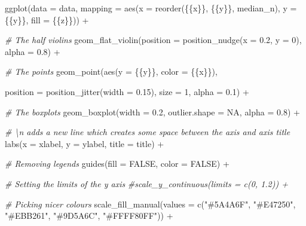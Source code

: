 \documentclass[a4paper,nobind]{templates/ociamthesis}
\newenvironment{Shaded}{\begin{snugshade}}{\end{snugshade}}
\newcommand{\AttributeTok}[1]{\textcolor[rgb]{0.77,0.63,0.00}{#1}}
\newcommand{\CommentTok}[1]{\textcolor[rgb]{0.56,0.35,0.01}{\textit{#1}}}
\newcommand{\ConstantTok}[1]{\textcolor[rgb]{0.00,0.00,0.00}{#1}}
\newcommand{\DecValTok}[1]{\textcolor[rgb]{0.00,0.00,0.81}{#1}}
\newcommand{\FloatTok}[1]{\textcolor[rgb]{0.00,0.00,0.81}{#1}}
\newcommand{\FunctionTok}[1]{\textcolor[rgb]{0.00,0.00,0.00}{#1}}
\newcommand{\NormalTok}[1]{#1}
\newcommand{\SpecialCharTok}[1]{\textcolor[rgb]{0.00,0.00,0.00}{#1}}
\newcommand{\StringTok}[1]{\textcolor[rgb]{0.31,0.60,0.02}{#1}}
\renewenvironment{Shaded}
{
  \vspace{10pt}%
  \begin{snugshade}%
}{%
  \end{snugshade}%
  \vspace{8pt}%
}
\begin{document}
\begin{landscape}
\begin{Shaded}
\begin{Highlighting}[]
  \FunctionTok{ggplot}\NormalTok{(}\AttributeTok{data =}\NormalTok{ data, }
           \AttributeTok{mapping =} \FunctionTok{aes}\NormalTok{(}\AttributeTok{x =} \FunctionTok{reorder}\NormalTok{(\{\{x\}\}, \{\{y\}\}, median\_n), }\AttributeTok{y =}\NormalTok{ \{\{y\}\}, }\AttributeTok{fill =}\NormalTok{ \{\{z\}\})) }\SpecialCharTok{+}
    
    \CommentTok{\# The half violins}
    \FunctionTok{geom\_flat\_violin}\NormalTok{(}\AttributeTok{position =} \FunctionTok{position\_nudge}\NormalTok{(}\AttributeTok{x =} \FloatTok{0.2}\NormalTok{, }\AttributeTok{y =} \DecValTok{0}\NormalTok{), }\AttributeTok{alpha =} \FloatTok{0.8}\NormalTok{) }\SpecialCharTok{+}
    
    \CommentTok{\# The points}
    \FunctionTok{geom\_point}\NormalTok{(}\FunctionTok{aes}\NormalTok{(}\AttributeTok{y =}\NormalTok{ \{\{y\}\}, }\AttributeTok{color =}\NormalTok{ \{\{x\}\}), }
    
    \AttributeTok{position =} \FunctionTok{position\_jitter}\NormalTok{(}\AttributeTok{width =} \FloatTok{0.15}\NormalTok{), }\AttributeTok{size =} \DecValTok{1}\NormalTok{, }\AttributeTok{alpha =} \FloatTok{0.1}\NormalTok{) }\SpecialCharTok{+}
    
    \CommentTok{\# The boxplots}
    \FunctionTok{geom\_boxplot}\NormalTok{(}\AttributeTok{width =} \FloatTok{0.2}\NormalTok{, }\AttributeTok{outlier.shape =} \ConstantTok{NA}\NormalTok{, }\AttributeTok{alpha =} \FloatTok{0.8}\NormalTok{) }\SpecialCharTok{+}
    
    \CommentTok{\# \textbackslash{}n adds a new line which creates some space between the axis and axis title}
    \FunctionTok{labs}\NormalTok{(}\AttributeTok{x =}\NormalTok{ xlabel, }\AttributeTok{y =}\NormalTok{ ylabel, }\AttributeTok{title =}\NormalTok{ title) }\SpecialCharTok{+}
    
    \CommentTok{\# Removing legends}
    \FunctionTok{guides}\NormalTok{(}\AttributeTok{fill =} \ConstantTok{FALSE}\NormalTok{, }\AttributeTok{color =} \ConstantTok{FALSE}\NormalTok{) }\SpecialCharTok{+}
    
    \CommentTok{\# Setting the limits of the y axis}
    \CommentTok{\#scale\_y\_continuous(limits = c(0, 1.2)) +}
    
    \CommentTok{\# Picking nicer colours}
    \FunctionTok{scale\_fill\_manual}\NormalTok{(}\AttributeTok{values =} \FunctionTok{c}\NormalTok{(}\StringTok{"\#5A4A6F"}\NormalTok{, }\StringTok{"\#E47250"}\NormalTok{,  }\StringTok{"\#EBB261"}\NormalTok{, }\StringTok{"\#9D5A6C"}\NormalTok{, }\StringTok{"\#FFFF80FF"}\NormalTok{)) }\SpecialCharTok{+}
    

\end{Highlighting}
\end{Shaded}
\end{landscape}
\end{document}
